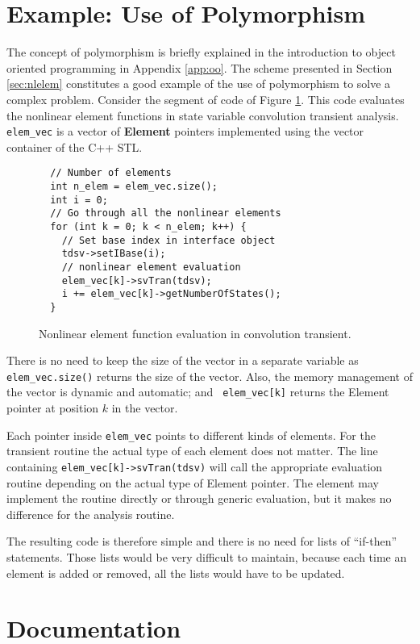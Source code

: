 \section{Example: Use of Polymorphism}

The concept of polymorphism is briefly explained in the introduction
to object oriented programming in Appendix \ref{app:oo}. The scheme
presented in Section \ref{sec:nlelem} constitutes a good example of the
use of polymorphism to solve a complex problem.  Consider the segment
of code of Figure \ref{fig:nleval}. This code evaluates the nonlinear
element functions in state variable convolution transient analysis. {\tt
elem\_vec} is a vector of {\bf Element} pointers implemented using the
vector container of the C++ STL.
%
\begin{figure}[htpb]
\begin{verbatim}
  // Number of elements
  int n_elem = elem_vec.size();
  int i = 0;
  // Go through all the nonlinear elements
  for (int k = 0; k < n_elem; k++) {
    // Set base index in interface object
    tdsv->setIBase(i);
    // nonlinear element evaluation
    elem_vec[k]->svTran(tdsv);
    i += elem_vec[k]->getNumberOfStates();
  }
\end{verbatim}
\caption{Nonlinear element function evaluation in convolution transient.}
\label{fig:nleval}
\end{figure}
%
There is no need to keep the size of the vector in a separate variable
as {\tt elem\_vec.size()} returns the size of the vector. Also, the
memory management of the vector is dynamic and automatic; and {\tt
elem\_vec[k]} returns the Element pointer at position $k$ in the
vector.

Each pointer inside {\tt elem\_vec} points to different kinds of
elements. For the transient routine the actual type of each element
does not matter. The line containing
{\tt elem\_vec[k]->svTran(tdsv)} will call the appropriate evaluation
routine depending on the actual type of Element pointer. The element
may implement the routine directly or through generic evaluation,
but it makes no difference for the analysis routine.

The resulting code is therefore simple and there is no need for lists
of ``if-then'' statements. Those lists would be very difficult to
maintain, because each time an element is added or removed, all the
lists would have to be updated.

\section{Documentation}

